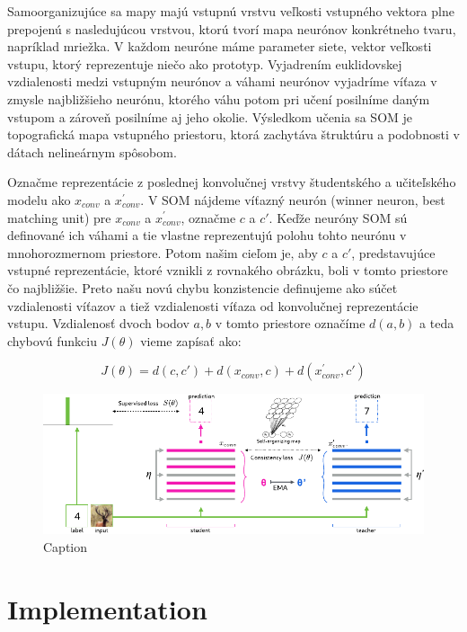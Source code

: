 Samoorganizujúce sa mapy majú vstupnú vrstvu veľkosti vstupného vektora plne prepojenú s nasledujúcou vrstvou, ktorú tvorí mapa neurónov konkrétneho tvaru, napríklad mriežka. V každom neuróne máme parameter siete, vektor veľkosti vstupu, ktorý reprezentuje niečo ako prototyp. Vyjadrením euklidovskej vzdialenosti medzi vstupným neurónov a váhami neurónov vyjadríme víťaza v zmysle najbližšieho neurónu, ktorého váhu potom pri učení posilníme daným vstupom a zároveň posilníme aj jeho okolie. Výsledkom učenia sa SOM je topografická mapa vstupného priestoru, ktorá zachytáva štruktúru a podobnosti v dátach nelineárnym spôsobom.



Označme reprezentácie z poslednej konvolučnej vrstvy študentského a učiteľského modelu ako $x_{conv}$ a $x^\prime_{conv}$. V SOM nájdeme víťazný neurón (winner neuron, best matching unit) pre $x_{conv}$ a $x^\prime_{conv}$, označme $c$ a $c\prime$. Keďže neuróny SOM sú definované ich váhami a tie vlastne reprezentujú polohu tohto neurónu v mnohorozmernom priestore. Potom našim cieľom je, aby $c$ a $c\prime$, predstavujúce vstupné reprezentácie, ktoré vznikli z rovnakého obrázku, boli v tomto priestore čo najbližšie. Preto našu novú chybu konzistencie definujeme ako súčet vzdialenosti víťazov a tiež vzdialenosti víťaza od konvolučnej reprezentácie vstupu. Vzdialenosť dvoch bodov $a, b$ v tomto priestore označíme $d(a, b)$ a teda chybovú funkciu $J(\theta)$ vieme zapísať ako:

\begin{equation}
  J(\theta) = d(c, c\prime) + d(x_{conv}, c) + d(x^\prime_{conv}, c\prime)  
\end{equation}


\begin{figure}
    \centering
    \includegraphics{figs/mean_teacher_som.pdf}
    \caption{Caption}
    \label{fig:mt-som}
\end{figure}

\section{Implementation}


